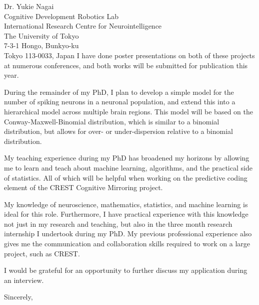 \documentclass[11pt]{letter} %
\begin{document}
\begin{letter}{Dr. Yukie Nagai \\ 
  Cognitive Development Robotics Lab \\ 
  International Research Centre for Neurointelligence \\
  The University of Tokyo \\
  7-3-1 Hongo, Bunkyo-ku \\
  Tokyo 113-0033, Japan}
  I have done poster presentations on both of these projects at numerous conferences, and both works will be submitted for publication this year. 

  During the remainder of my PhD, I plan to develop a simple model for the number of spiking neurons in a neuronal population, and extend this into a hierarchical model across multiple brain regions. This model will be based on the Conway-Maxwell-Binomial distribution, which is similar to a binomial distribution, but allows for over- or under-dispersion relative to a binomial distribution. 

  My teaching experience during my PhD has broadened my horizons by allowing me to learn and teach about machine learning, algorithms, and the practical side of statistics. All of which will be helpful when working on the predictive coding element of the CREST Cognitive Mirroring project. 

  My knowledge of neuroscience, mathematics, statistics, and machine learning is ideal for this role. Furthermore, I have practical experience with this knowledge not just in my research and teaching, but also in the three month research internship I undertook during my PhD. My previous professional experience also gives me the communication and collaboration skills required to work on a large project, such as CREST. 

  I would be grateful for an opportunity to further discuss my application during an interview.

  \vspace{2\parskip} %
  \closing{Sincerely,}
  \vspace{2\parskip} %




\end{letter}
 
\end{document}
